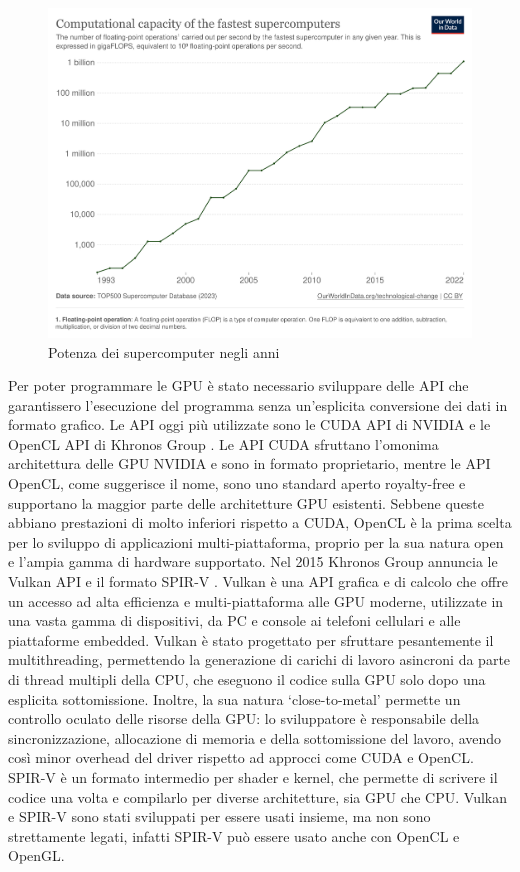 \begin{figure}[ht]
\centering
\includegraphics[width=.9\linewidth]{images/chapter1/supercomputer_flops.png}
\caption{Potenza dei supercomputer negli anni}
\label{fig:supercomputer_flops}
\end{figure}


Per poter programmare le GPU è stato necessario sviluppare delle \gls{API} che garantissero l'esecuzione del programma senza un'esplicita conversione dei dati in formato grafico. Le API oggi più utilizzate sono le \gls{CUDA} API di NVIDIA \cite[]{NVIDIA:CUDA} e le OpenCL API di Khronos Group \cite[]{KG:OpenCL}. Le API CUDA sfruttano l'omonima architettura delle GPU NVIDIA e sono in formato proprietario, mentre le API OpenCL, come suggerisce il nome, sono uno standard aperto royalty-free e supportano la maggior parte delle architetture GPU esistenti. Sebbene queste abbiano prestazioni di molto inferiori rispetto a CUDA, OpenCL è la prima scelta per lo sviluppo di applicazioni multi-piattaforma, proprio per la sua natura open e l'ampia gamma di hardware supportato. Nel 2015 Khronos Group annuncia le Vulkan API \cite[]{KG:Vulkan} e il formato SPIR-V \cite[]{KG:SPIR-V}. Vulkan è una API grafica e di calcolo che offre un accesso ad alta efficienza e multi-piattaforma alle GPU moderne, utilizzate in una vasta gamma di dispositivi, da PC e console ai telefoni cellulari e alle piattaforme embedded. Vulkan è stato progettato per sfruttare pesantemente il multithreading, permettendo la generazione di carichi di lavoro asincroni da parte di thread multipli della CPU, che eseguono il codice sulla GPU solo dopo una esplicita sottomissione. Inoltre, la sua natura `close-to-metal' permette un controllo oculato delle risorse della GPU: lo sviluppatore è responsabile della sincronizzazione, allocazione di memoria e della sottomissione del lavoro, avendo così minor overhead del driver rispetto ad approcci come CUDA e OpenCL. SPIR-V è un formato intermedio per shader e kernel, che permette di scrivere il codice una volta e compilarlo per diverse architetture, sia GPU che CPU. Vulkan e SPIR-V sono stati sviluppati per essere usati insieme, ma non sono strettamente legati, infatti SPIR-V può essere usato anche con OpenCL e OpenGL.

